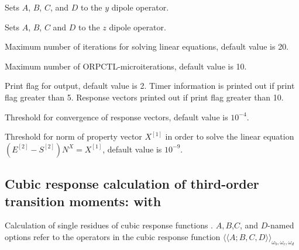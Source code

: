 \begin{description}
\item{}
Sets $A$, $B$, $C$, and $D$ to the $y$ dipole operator.

\item{}
Sets $A$, $B$, $C$ and $D$ to the $z$ dipole operator.

\item{}
Maximum number of iterations for solving linear equations, default value is 20.

\item{}
Maximum number of ORPCTL-microiterations, default value is 10.

\item{}
Print flag for output, default value is 2. Timer information is printed
out if print flag greater than 5. Response vectors printed out if
print flag greater than 10.

\item{}
Threshold for convergence of response vectors, default value is $10^{-4}$.

\item{}
Threshold for norm of property vector $X^{[1]}$ in order to solve the linear
equation \\
$\left( E^{[2]} - S^{[2]} \right)N^{X} = X^{[1]}$, default
value is $10^{-9}$. 



\end{description}

\subsection{Cubic response calculation of third-order transition moments:
 with }
Calculation of single residues of
cubic response functions
\cite{pndjovhacpl242,djpnhajcp105,pndjhapdkrthhkcpl253}.
$A,B$,$C$, and $D$-named options refer to the operators in the cubic
response function 
$\langle\!\langle A;B,C,D \rangle\!\rangle_{\omega_b,\omega_c,\omega_d}$

